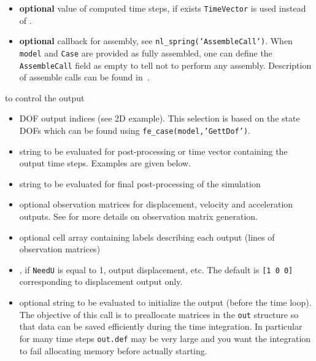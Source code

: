 \begin{itemize}
\item {} {\bf optional} value of computed time steps, if exists {\tt TimeVector} is used instead of . \\

\item {} {\bf optional} callback for assembly, see {\tt nl\_spring('AssembleCall')}. When {\tt model} and {\tt Case} are provided as fully assembled, one can define the {\tt AssembleCall} field as empty to tell \fetime not to perform any assembly. Description of assemble calls can be found in~. 


\end{itemize}

to control the output

\begin{itemize}
\item {}   DOF output indices (see 2D example). This selection is based on the state DOFs which can be found using {\tt fe\_case(model,'GettDof')}.
\item {}  string to be evaluated for post-processing or time vector containing the output time steps. Examples are given below.
\item {}  string to be evaluated for final post-processing of the simulation\\

\item  {}  optional observation matrices for displacement, velocity and acceleration outputs. See  for more details on observation matrix generation. 

\item {}  optional cell array containing labels describing each output (lines of observation matrices)

\item {} , if {\tt NeedU} is equal to 1,
output displacement, etc. The default is {\tt [1 0 0]} corresponding to displacement output only. 

\item {}  optional string to be evaluated to initialize the output (before the time loop). The objective of this call is to preallocate matrices in the {\tt out} structure so that data can be saved efficiently during the time integration. In particular for many time steps {\tt out.def} may be very large and you want the integration to fail allocating memory before actually starting. 


\end{itemize}
